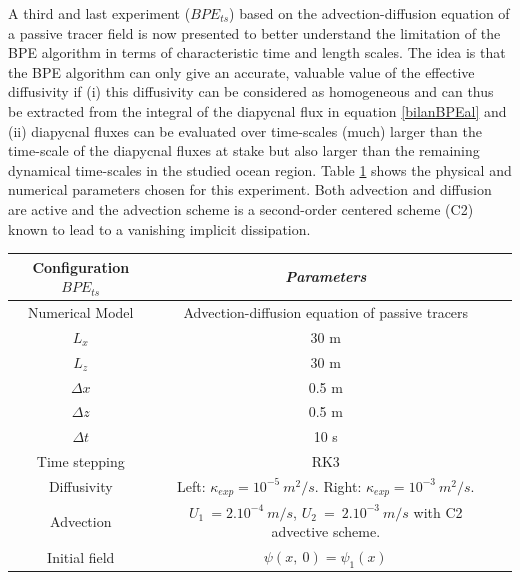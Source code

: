 A third and last experiment ($BPE_{ts}$) based on the advection-diffusion equation of a passive tracer field is now presented to better understand the limitation of the BPE algorithm in terms of characteristic time and length scales. The idea is that the BPE algorithm can only give an accurate, valuable value of the effective diffusivity if (i) this diffusivity can be considered as homogeneous and can thus be extracted from the integral of the diapycnal flux in equation \ref{bilanBPEal} and (ii) diapycnal fluxes can be evaluated over time-scales (much) larger than the time-scale of the diapycnal fluxes at stake but also larger than the remaining dynamical time-scales in the studied ocean region.
Table \ref{tab_NUMLAB_ts} shows the physical and numerical parameters chosen for this experiment. Both advection and diffusion are active and the advection scheme is a second-order centered scheme (C2) known to lead to a vanishing implicit dissipation.\\
\begin{table}[h]
        \centering
        \begin{tabular}{|c|c|c|}
                \hline
                Configuration $BPE_{ts}$ & \textit{Parameters}\\
                \hline 
                Numerical Model & Advection-diffusion equation of passive tracers\\
                $L_x$ & 30 m\\
                $L_z$ & 30 m\\
                $\Delta x$ & 0.5 m\\
                $\Delta z$ & 0.5 m\\
                $\Delta t$ & 10 s\\
                Time stepping & RK3 \\
                Diffusivity & Left: $\kappa_{exp} = 10^{-5} \ m^2/s$. Right: $\kappa_{exp} = 10^{-3} \ m^2/s$.\\
                Advection & $U_1\ = 2.10^{-4}\ m/s$, $U_2\ =\ 2.10^{-3}\ m/s$ with C2 advective scheme.\\
                Initial field & $\psi(x,\ 0)=\psi_1(x)$\\
                \hline
        \end{tabular}
        \label{tab_NUMLAB_ts}
\end{table}
